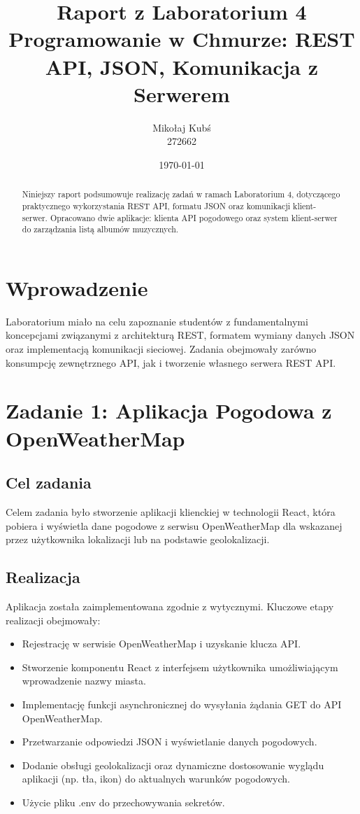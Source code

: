 \documentclass[11pt, a4paper]{article}
\title{Raport z Laboratorium 4 \\ \large Programowanie w Chmurze: REST API, JSON, Komunikacja z Serwerem}
\author{Mikołaj Kubś \\ 272662}
\date{\today}
\begin{document}
\maketitle
\begin{abstract}
Niniejszy raport podsumowuje realizację zadań w ramach Laboratorium 4, dotyczącego praktycznego wykorzystania REST API, formatu JSON oraz komunikacji klient-serwer. Opracowano dwie aplikacje: klienta API pogodowego oraz system klient-serwer do zarządzania listą albumów muzycznych.
\end{abstract}

\section{Wprowadzenie}
Laboratorium miało na celu zapoznanie studentów z fundamentalnymi koncepcjami związanymi z architekturą REST, formatem wymiany danych JSON oraz implementacją komunikacji sieciowej. Zadania obejmowały zarówno konsumpcję zewnętrznego API, jak i tworzenie własnego serwera REST API.

\section{Zadanie 1: Aplikacja Pogodowa z OpenWeatherMap}
\subsection{Cel zadania}
Celem zadania było stworzenie aplikacji klienckiej w technologii React, która pobiera i wyświetla dane pogodowe z serwisu OpenWeatherMap dla wskazanej przez użytkownika lokalizacji lub na podstawie geolokalizacji.

\subsection{Realizacja}
Aplikacja została zaimplementowana zgodnie z wytycznymi. Kluczowe etapy realizacji obejmowały:
\begin{itemize}
    \item Rejestrację w serwisie OpenWeatherMap i uzyskanie klucza API.
    \item Stworzenie komponentu React z interfejsem użytkownika umożliwiającym wprowadzenie nazwy miasta.
    \item Implementację funkcji asynchronicznej do wysyłania żądania GET do API OpenWeatherMap.
    \item Przetwarzanie odpowiedzi JSON i wyświetlanie danych pogodowych.
    \item Dodanie obsługi geolokalizacji oraz dynamiczne dostosowanie wyglądu aplikacji (np. tła, ikon) do aktualnych warunków pogodowych.
    \item Użycie pliku .env do przechowywania sekretów.
\end{itemize}
\end{document}
